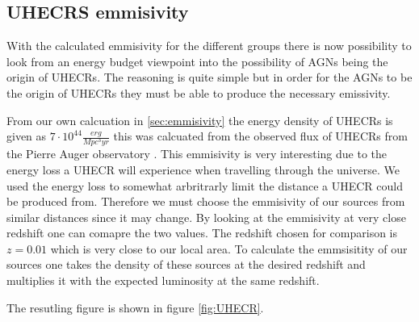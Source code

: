 \documentclass{article}
\begin{document}
\subsection{UHECRS emmisivity}
With the calculated emmisivity for the different groups there is now possibility to look from an energy budget viewpoint into the possibility of AGNs being the origin of UHECRs. The 
reasoning is quite simple but in order for the AGNs to be the origin of UHECRs they must be able to produce the necessary emissivity. 

From our own calcuation in \ref{sec:emmisivity} the energy density of UHECRs is given as $7 \cdot 10^{44}\frac{erg}{Mpc^3yr}$ this was calcuated from the observed flux of UHECRs from the Pierre Auger observatory \cite{thepierreaugercollaboration2017pierre}.
This emmisivity is very interesting due to the energy loss a UHECR will experience when travelling through the universe. We used the energy loss to somewhat arbritrarly limit the distance a UHECR could be produced from.
Therefore we must choose the emmisivity of our sources from similar distances since it may change. By looking at the emmisivity at very close redshift one can comapre the two values. The redshift chosen for comparison is $z=0.01$ which is  very close to our local area. %
To calculate the emmsisitity of our sources one takes the density of these sources at the desired redshift and multiplies it with the expected luminosity at the same redshift.



The resutling figure is shown in figure \ref{fig:UHECR}.
\end{document}
